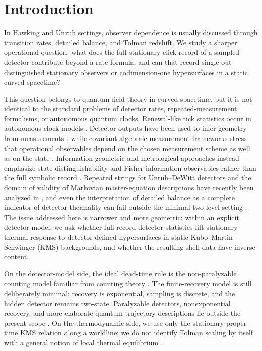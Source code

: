 \section{Introduction}\label{sec:bridge:intro}

In Hawking and Unruh settings, observer dependence is usually discussed through transition rates, detailed balance, and Tolman redshift. We study a sharper operational question: what does the full stationary click record of a sampled detector contribute beyond a rate formula, and can that record single out distinguished stationary observers or codimension-one hypersurfaces in a static curved spacetime?

This question belongs to quantum field theory in curved spacetime, but it is not identical to the standard problems of detector rates, repeated-measurement formalisms, or autonomous quantum clocks. Renewal-like tick statistics occur in autonomous clock models \cite{ErkerEtAl2017}. Detector outputs have been used to infer geometry from measurements \cite{PercheMartinMartinez2022}, while covariant algebraic measurement frameworks stress that operational observables depend on the chosen measurement scheme as well as on the state \cite{Fewster2020}. Information-geometric and metrological approaches instead emphasize state distinguishability and Fisher-information observables rather than the full symbolic record \cite{BraunsteinCaves1994,WangEtAl2014Metrology,HaoWu2016Unruh,FengZhang2022QFI,DuMann2021AdS}. Repeated strings for Unruh--DeWitt detectors and the domain of validity of Markovian master-equation descriptions have recently been analyzed in \cite{PranziniEtAl2024,HanEtAl2025}, and even the interpretation of detailed balance as a complete indicator of detector thermality can fail outside the minimal two-level setting \cite{LimaEtAl2023Qudit}. The issue addressed here is narrower and more geometric: within an explicit detector model, we ask whether full-record detector statistics lift stationary thermal response to detector-defined hypersurfaces in static Kubo--Martin--Schwinger (KMS) backgrounds, and whether the resulting shell data have inverse content.

On the detector-model side, the ideal dead-time rule is the non-paralyzable counting model familiar from counting theory \cite{Muller1973,CantorTeich1975}. The finite-recovery model is still deliberately minimal: recovery is exponential, sampling is discrete, and the hidden detector remains two-state. Paralyzable detectors, nonexponential recovery, and more elaborate quantum-trajectory descriptions lie outside the present scope \cite{Carmichael1993Book,WisemanMilburn2009}. On the thermodynamic side, we use only the stationary proper-time KMS relation along a worldline; we do not identify Tolman scaling by itself with a general notion of local thermal equilibrium \cite{BuchholzSchlemmer2007,Solveen2012,BuchholzSolveen2013,GranseePinamontiVerch2017}.


